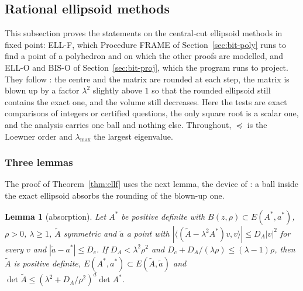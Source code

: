 \documentclass[11pt]{amsart}
\newtheorem{lemma}[theorem]{Lemma}
\theoremstyle{definition}
\numberwithin{equation}{section}
\newcommand{\ip}[1]{\langle #1\rangle}
\begin{document}
\subsection{Rational ellipsoid methods}\label{app:ell}

This subsection proves the statements on the central-cut ellipsoid methods in fixed point: ELL-F, which Procedure FRAME of Section~\ref{sec:bit-poly} runs to find a point of a polyhedron and on which the other proofs are modelled, and ELL-O and BIS-O of Section~\ref{sec:bit-proj}, which the program runs to project. They follow \cite[Theorem~(3.2.1)]{GLS93}: the centre and the matrix are rounded at each step, the matrix is blown up by a factor $\lambda^2$ slightly above $1$ so that the rounded ellipsoid still contains the exact one, and the volume still decreases. Here the tests are exact comparisons of integers or certified questions, the only square root is a scalar one, and the analysis carries one ball and nothing else. Throughout, $\preceq$ is the Loewner order and $\lambda_{\max}$ the largest eigenvalue.

\subsubsection{Three lemmas}
The proof of Theorem~\ref{thm:ellf} uses the next lemma, the device of \cite[Lemma~2.3]{Gof84}: a ball inside the exact ellipsoid absorbs the rounding of the blown-up one.

\begin{lemma}[absorption]\label{lem:abs}
Let $A^*$ be positive definite with $B(z,\rho)\subset E(A^*,a^*)$, $\rho>0$, $\lambda\ge1$, $\tilde A$ symmetric and $\tilde a$ a point with $|\ip{(\tilde A-\lambda^2A^*)v,v}|\le D_A|v|^2$ for every $v$ and $|\tilde a-a^*|\le D_c$. If $D_A<\lambda^2\rho^2$ and $D_c+D_A/(\lambda\rho)\le(\lambda-1)\rho$, then $\tilde A$ is positive definite, $E(A^*,a^*)\subset E(\tilde A,\tilde a)$ and $\det\tilde A\le(\lambda^2+D_A/\rho^2)^d\det A^*$.
\end{lemma}
\end{document}
